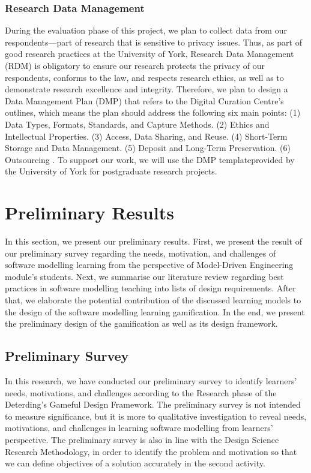 \documentclass[12pt, a4paper]{report}
\begin{document}
{\subsection{Research Data Management}
During the evaluation phase of this project, we plan to collect data from our respondents---part of research that is sensitive to privacy issues. Thus, as part of good research practices at the University of York\footnotemark {}, Research Data Management (RDM) is obligatory to ensure our research protects the privacy of our respondents, conforms to the law, and respects research ethics, as well as to demonstrate research excellence and integrity. Therefore, we plan to design a Data Management Plan (DMP) that refers to the Digital Curation Centre's outlines, which means the plan should address the following six main points: (1) Data Types, Formats, Standards, and Capture Methods. (2) Ethics and Intellectual Properties. (3) Access, Data Sharing, and Reuse. (4) Short-Term Storage and Data Management. (5) Deposit and Long-Term Preservation. (6) Outsourcing \cite{jones2011develop}. To support our work, we will use the DMP template\footnotemark[\value{footnote}] provided by the University of York for postgraduate research projects.
  
\chapter{Preliminary Results}
In this section, we present our preliminary results. First, we present the result of our preliminary survey regarding the needs, motivation, and challenges of software modelling learning from the perspective of Model-Driven Engineering module's students. Next, we summarise our literature review regarding best practices in software modelling teaching into lists of design requirements. After that, we elaborate the potential contribution of the discussed learning models to the design of the software modelling learning gamification. In the end, we present the preliminary design of the gamification as well as  its design framework. 

\section{Preliminary Survey}
\label{Preliminary Survey}
In this research, we have conducted our preliminary survey to identify learners' needs, motivations, and challenges according to the Research phase of the Deterding's Gameful Design Framework. The preliminary survey is not intended to measure significance, but it is more to qualitative investigation to reveal needs, motivations, and challenges in learning software modelling from learners' perspective.    The preliminary survey is also in line with the Design Science Research Methodology, in order to identify the problem and motivation so that we can define objectives of a solution accurately in the second activity. 

}
\end{document}
